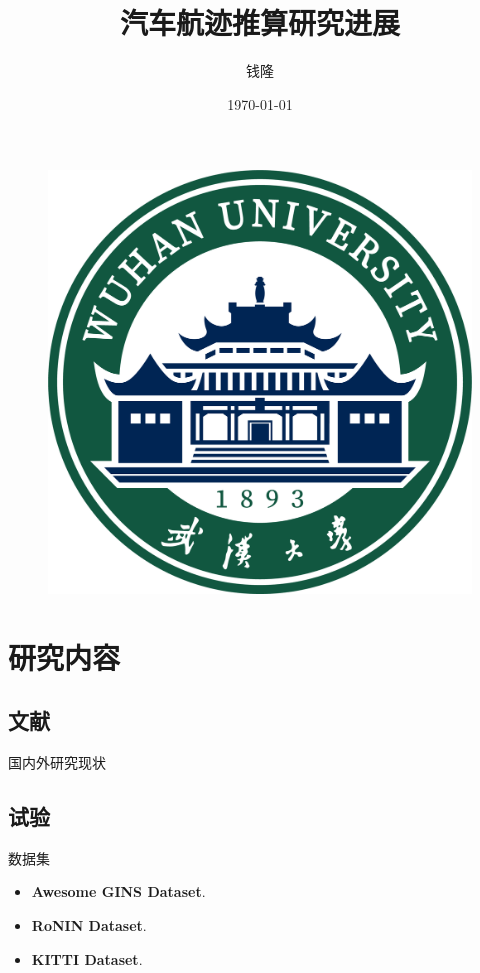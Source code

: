 \documentclass{beamer}
\author{钱隆}
\title{汽车航迹推算研究进展}
\subtitle{}
\institute{武汉大学测绘遥感信息工程国家重点实验室}
\date{\today}
\begin{document}
\kaishu
\begin{frame} %
    \titlepage
    \begin{figure}[htpb]
        \begin{center}
            \includegraphics[width=0.2\linewidth]{pic/Wuhan_University_Logo.png} %
        \end{center}
    \end{figure}
\end{frame}

\begin{frame}
    \tableofcontents[sectionstyle=show,subsectionstyle=show/shaded/hide,subsubsectionstyle=show/shaded/hide]
\end{frame}


\section{研究内容}

\subsection{文献}

\begin{frame}{国内外研究现状}

\end{frame}

\subsection{试验}

\begin{frame}{数据集}
    \begin{itemize}
        \item \textbf{Awesome GINS Dataset}.
        \item \textbf{RoNIN Dataset}.
        \item \textbf{KITTI Dataset}.
    \end{itemize}
\end{frame}
\end{document}
